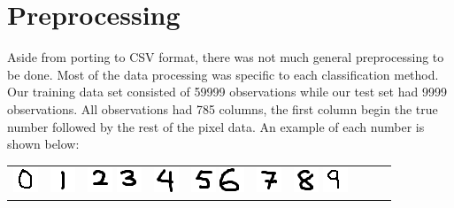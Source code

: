 \documentclass[10pt]{extarticle}
\begin{document}
\section{Preprocessing}

Aside from porting to CSV format, there was not much general preprocessing to be done. Most of the data processing was specific to each classification method. Our training data set consisted of 59999 observations while our test set had 9999 observations. All observations had 785 columns, the first column begin the true number followed by the rest of the pixel data. An example of each number is shown below:

\begin{center}
	\begin{tabular}{c c c c c c c c c c}
		\includegraphics{zero.png} & \includegraphics{one.png} & \includegraphics{two.png} 
		\includegraphics{three.png} & \includegraphics{four.png} & \includegraphics{five.png} 
		\includegraphics{six.png} &\includegraphics{seven.png} &\includegraphics{eight.png} 
		\includegraphics{nine.png}
	\end{tabular} 
\end{center}
\end{document}
